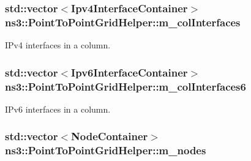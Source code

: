 \subsubsection[{\texorpdfstring{m\+\_\+col\+Interfaces}{m_colInterfaces}}]{\setlength{\rightskip}{0pt plus 5cm}std\+::vector$<${\bf Ipv4\+Interface\+Container}$>$ ns3\+::\+Point\+To\+Point\+Grid\+Helper\+::m\+\_\+col\+Interfaces\hspace{0.3cm}{\ttfamily [private]}}\hypertarget{classns3_1_1PointToPointGridHelper_a838c160d812d12f4a116861b6390ebc4}{}\label{classns3_1_1PointToPointGridHelper_a838c160d812d12f4a116861b6390ebc4}


I\+Pv4 interfaces in a column. 

\subsubsection[{\texorpdfstring{m\+\_\+col\+Interfaces6}{m_colInterfaces6}}]{\setlength{\rightskip}{0pt plus 5cm}std\+::vector$<${\bf Ipv6\+Interface\+Container}$>$ ns3\+::\+Point\+To\+Point\+Grid\+Helper\+::m\+\_\+col\+Interfaces6\hspace{0.3cm}{\ttfamily [private]}}\hypertarget{classns3_1_1PointToPointGridHelper_a10024c662eaa7a615ddf4d15f4e3a010}{}\label{classns3_1_1PointToPointGridHelper_a10024c662eaa7a615ddf4d15f4e3a010}


I\+Pv6 interfaces in a column. 

\subsubsection[{\texorpdfstring{m\+\_\+nodes}{m_nodes}}]{\setlength{\rightskip}{0pt plus 5cm}std\+::vector$<${\bf Node\+Container}$>$ ns3\+::\+Point\+To\+Point\+Grid\+Helper\+::m\+\_\+nodes\hspace{0.3cm}{\ttfamily [private]}}\hypertarget{classns3_1_1PointToPointGridHelper_a6b36a3c5b58497f3899b089807b25266}{}\label{classns3_1_1PointToPointGridHelper_a6b36a3c5b58497f3899b089807b25266}


